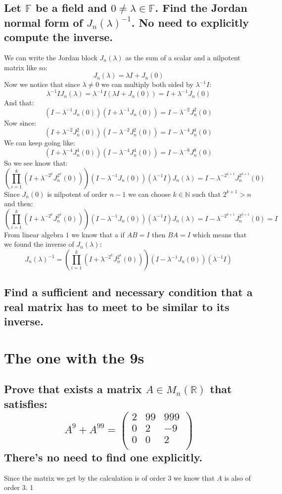 \documentclass[11pt,a4paper]{article}
\theoremstyle{plain}
\newcommand{\N}{\mathbb{N}}
\newcommand{\R}{\mathbb{R}}
\newcommand{\F}{\mathbb{F}}
\begin{document}
	\subsection{Let $\F$ be a field and $0\neq\lambda\in\F$. Find the Jordan 
	normal form of $J_n(\lambda)^{-1}$. No need to explicitly compute the
	inverse.}
	We can write the Jordan block $J_n(\lambda)$ as the sum of a scalar and
	a nilpotent matrix like so:
	\[
		J_n(\lambda) = \lambda I + J_n(0)
	\]
	Now we notice that since $\lambda \neq 0$ we can multiply both sided by 
	$\lambda^{-1} I$:
	\[
		\lambda^{-1} I J_n(\lambda) =\lambda^{-1} I(\lambda I + J_n(0)) = 
		I + \lambda^{-1}J_n(0)
	\]
	And that:
	\[
		(I - \lambda^{-1}J_n(0))(I + \lambda^{-1}J_n(0)) = 
		I - \lambda^{-2}J_n^2(0)
	\]
	Now since:
	\[
		(I + \lambda^{-2}J_n^2(0))(I - \lambda^{-2}J_n^2(0)) = 
		I - \lambda^{-4}J_n^4(0)
	\]
	We can keep going like:
	\[
		(I + \lambda^{-4}J_n^4(0))(I - \lambda^{-4}J_n^4(0)) = 
		I - \lambda^{-8}J_n^8(0)
	\]
	So we see know that:
	\[
		\left(\prod_{i=1}^{k}{(I + \lambda^{-2^k}J_n^{2^k}(0))}\right)
		(I - \lambda^{-1}J_n(0))(\lambda^{-1} I)J_n(\lambda) = I - \lambda^{-2^{k+1}}
		J_n^{2^{k+1}}(0)
	\]
	Since $J_n(0)$ is nilpotent of order $n-1$ we can choose $k\in\N$ such that
	$2^{k+1} > n$ and then:
	\[
		\left(\prod_{i=1}^{k}{(I + \lambda^{-2^k}J_n^{2^k}(0))}\right)
		(I - \lambda^{-1}J_n(0))(\lambda^{-1} I)J_n(\lambda) = I - \lambda^{-2^{k+1}}
		J_n^{2^{k+1}}(0) = I
	\]
	From linear algebra $1$ we know that a if $AB=I$ then $BA=I$ which means
	that we found the inverse of $J_n(\lambda)$:
	\[
		J_n(\lambda)^{-1} = \left(\prod_{i=1}^{k}{(I + \lambda^{-2^k}J_n^{2^k}(0))}
		\right)(I - \lambda^{-1}J_n(0))(\lambda^{-1} I)
	\]

	\newpage

	\subsection{Find a sufficient and necessary condition that a real matrix has to
	meet to be similar to its inverse.}


	\newpage

	\section{The one with the 9s}
	\subsection{Prove that exists a matrix $A\in M_n(\R)$ that satisfies:
	\[
		A^9+A^{99} = \begin{pmatrix}
		2 & 99 & 999\\
		0 & 2 & -9\\
		0 & 0 & 2\\
	\end{pmatrix}
	\] There's no need to find one explicitly.}
	Since the matrix we get by the calculation is of order $3$ we know that $A$
	is also of order $3$. 1
\end{document}
